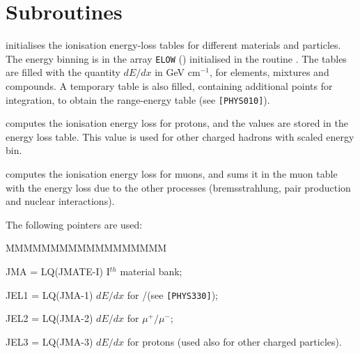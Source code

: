   

\section{Subroutines}


 initialises the ionisation energy-loss tables for different
materials and particles.
The energy binning is in the array
{\tt ELOW} () initialised in the routine .
The tables are filled with the quantity $dE/dx$ in GeV cm$^{-1}$,
for elements, mixtures and compounds. A
temporary table is also filled, containing 
additional points for integration, to obtain the range-energy
table (see {\tt [PHYS010]}).

 computes the ionisation energy loss for protons,
and the values are stored in the energy loss table.
This value is used for other charged hadrons with scaled energy bin.

 computes the ionisation energy loss for muons,
and sums it in the muon table
with the energy loss due to the other processes
(bremsstrahlung, pair production and nuclear interactions). 

The following pointers are used:

\begin{DLtt}{MMMMMMMMMMMMMMMMMM}
\item[JMA = LQ(JMATE-I)]    I$^{th}$ material bank;
\item[JEL1 = LQ(JMA-1)]     $dE/dx$ for \Pep/\Pem (see {\tt [PHYS330]});
\item[JEL2 = LQ(JMA-2)]     $dE/dx$ for $\mu^+/\mu^-$;
\item[JEL3 = LQ(JMA-3)]     $dE/dx$ for protons (used also 
for other charged particles).
\end{DLtt}

